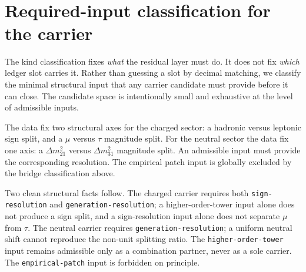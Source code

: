 \documentclass[11pt]{article}
\begin{document}
\begin{code}
\<%
\\
%
\>[2]\AgdaSymbol{;}\AgdaSpace{}%
%
\>[27]\AgdaSymbol{=}\AgdaSpace{}%
\<%
\\
%
\>[2]\AgdaSymbol{;}\AgdaSpace{}%
%
\>[27]\AgdaSymbol{=}\AgdaSpace{}%
\<%
\\
%
\>[2]\AgdaSymbol{;}\AgdaSpace{}%
%
\>[27]\AgdaSymbol{=}\AgdaSpace{}%
\<%
\\
%
\>[2]\AgdaSymbol{;}\AgdaSpace{}%
\AgdaSpace{}%
\AgdaSymbol{=}\AgdaSpace{}%
\<%
\\
%
\>[2]\AgdaSymbol{;}\AgdaSpace{}%
\AgdaSpace{}%
\AgdaSymbol{=}\AgdaSpace{}%
\<%
\\
%
\>[2]\AgdaSymbol{\}}\<%
\end{code}

\section{Required-input classification for the carrier}

The kind classification fixes \emph{what} the residual layer must do.
It does not fix \emph{which} ledger slot carries it.  Rather than
guessing a slot by decimal matching, we classify the minimal structural
input that any carrier candidate must provide before it can close.  The
candidate space is intentionally small and exhaustive at the level of
admissible inputs.

The data fix two structural axes for the charged sector: a hadronic
versus leptonic sign split, and a $\mu$ versus $\tau$ magnitude split.
For the neutral sector the data fix one axis: a $\Delta m^2_{21}$
versus $\Delta m^2_{31}$ magnitude split.  An admissible input must
provide the corresponding resolution.  The empirical patch input is
globally excluded by the bridge classification above.

Two clean structural facts follow.  The charged carrier requires both
\texttt{sign-resolution} and \texttt{generation-resolution}; a
higher-order-tower input alone does not produce a sign split, and a
sign-resolution input alone does not separate $\mu$ from $\tau$.  The
neutral carrier requires \texttt{generation-resolution}; a uniform
neutral shift cannot reproduce the non-unit splitting ratio.  The
\texttt{higher-order-tower} input remains admissible only as a
combination partner, never as a sole carrier.  The
\texttt{empirical-patch} input is forbidden on principle.
\end{document}
